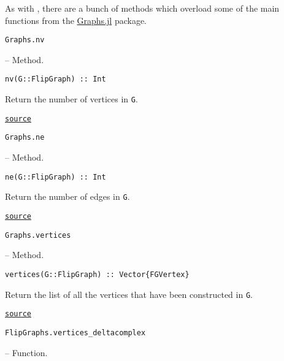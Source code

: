 \label{18181481596881829449}{}


As with , there are a bunch of methods which overload some of the main functions from the \href{https://juliagraphs.org/Graphs.jl/stable/}{Graphs.jl} package.


\hypertarget{13593568570027390357}{\texttt{Graphs.nv}}  -- {Method.}

\begin{adjustwidth}{2em}{0pt}


\begin{verbatim}
nv(G::FlipGraph) :: Int
\end{verbatim}

Return the number of vertices in \texttt{G}.



\href{https://github.com/schto223/FlipGraphs.jl/blob/490c01a7adf74b42f27dda05099165c47ae8133e/src/flipGraph.jl#L228-L232}{\texttt{source}}


\end{adjustwidth}
\hypertarget{2573469596919273383}{\texttt{Graphs.ne}}  -- {Method.}

\begin{adjustwidth}{2em}{0pt}


\begin{verbatim}
ne(G::FlipGraph) :: Int
\end{verbatim}

Return the number of edges in \texttt{G}.



\href{https://github.com/schto223/FlipGraphs.jl/blob/490c01a7adf74b42f27dda05099165c47ae8133e/src/flipGraph.jl#L221-L225}{\texttt{source}}


\end{adjustwidth}
\hypertarget{13164447363141201356}{\texttt{Graphs.vertices}}  -- {Method.}

\begin{adjustwidth}{2em}{0pt}


\begin{verbatim}
vertices(G::FlipGraph) :: Vector{FGVertex}
\end{verbatim}

Return the list of all the vertices that have been constructed in \texttt{G}.



\href{https://github.com/schto223/FlipGraphs.jl/blob/490c01a7adf74b42f27dda05099165c47ae8133e/src/flipGraph.jl#L235-L239}{\texttt{source}}


\end{adjustwidth}
\hypertarget{2224360680418397816}{\texttt{FlipGraphs.vertices\_deltacomplex}}  -- {Function.}

